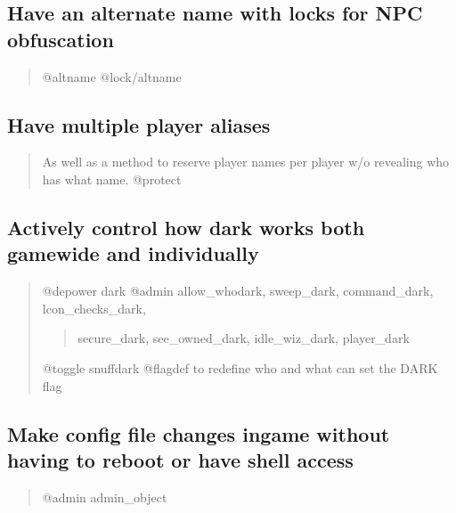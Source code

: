 \documentclass[letterpaper,10pt,english]{sphinxmanual}
\begin{document}
\subsection{Have an alternate name with locks for NPC obfuscation}
\label{\detokenize{features:have-an-alternate-name-with-locks-for-npc-obfuscation}}\begin{quote}

\sphinxAtStartPar
@altname
@lock/altname
\end{quote}


\subsection{Have multiple player aliases}
\label{\detokenize{features:have-multiple-player-aliases}}\begin{quote}

\sphinxAtStartPar
As well as a method
to reserve player names per player w/o revealing who has what
name.
@protect
\end{quote}


\subsection{Actively control how dark works both game\sphinxhyphen{}wide and individually}
\label{\detokenize{features:actively-control-how-dark-works-both-game-wide-and-individually}}\begin{quote}

\sphinxAtStartPar
@depower dark
@admin allow\_whodark, sweep\_dark, command\_dark, lcon\_checks\_dark,
\begin{quote}

\sphinxAtStartPar
secure\_dark, see\_owned\_dark, idle\_wiz\_dark, player\_dark
\end{quote}

\sphinxAtStartPar
@toggle snuffdark
@flagdef to redefine who and what can set the DARK flag
\end{quote}


\subsection{Make config file changes in\sphinxhyphen{}game without having to reboot or have shell access}
\label{\detokenize{features:make-config-file-changes-in-game-without-having-to-reboot-or-have-shell-access}}\begin{quote}

\sphinxAtStartPar
@admin admin\_object
\end{quote}
\end{document}
